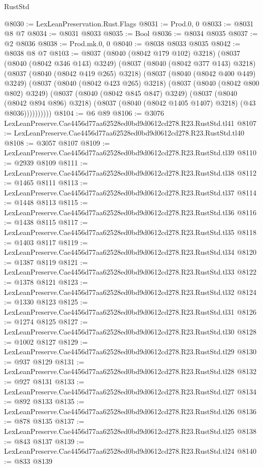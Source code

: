 \begin{lexlean}{RustStd}
\begin{coremodule}
@8030 := LexLeanPreservation.Rust.Flags
@8031 := Prod.{0, 0}
@8033 := @8031 @8 @7
@8034 := @8031 @8033
@8035 := Bool
@8036 := @8034 @8035
@8037 := @2 @8036
@8038 := Prod.mk.{0, 0}
@8040 := @8038 @8033 @8035
@8042 := @8038 @8 @7
@8103 := @8037
    (@8040 (@8042 @179 @102) @3218)
    (@8037
      (@8040 (@8042 @346 @143) @3249)
      (@8037
        (@8040 (@8042 @377 @143) @3218)
        (@8037
          (@8040 (@8042 @419 @265) @3218)
          (@8037
            (@8040 (@8042 @400 @449) @3249)
            (@8037
              (@8040 (@8042 @423 @265) @3218)
              (@8037
                (@8040 (@8042 @800 @802) @3249)
                (@8037
                  (@8040 (@8042 @845 @847) @3249)
                  (@8037
                    (@8040 (@8042 @894 @896) @3218)
                    (@8037 (@8040 (@8042 @1405 @1407) @3218) (@43 @8036))))))))))
@8104 := @6 @89
@8106 := @3076 LexLeanPreserve.Cae4456d77aa62528ed0bd9d0612cd278.R23.RustStd.tl41
@8107 := LexLeanPreserve.Cae4456d77aa62528ed0bd9d0612cd278.R23.RustStd.tl40
@8108 := @3057 @8107
@8109 := LexLeanPreserve.Cae4456d77aa62528ed0bd9d0612cd278.R23.RustStd.tl39
@8110 := @2939 @8109
@8111 := LexLeanPreserve.Cae4456d77aa62528ed0bd9d0612cd278.R23.RustStd.tl38
@8112 := @1465 @8111
@8113 := LexLeanPreserve.Cae4456d77aa62528ed0bd9d0612cd278.R23.RustStd.tl37
@8114 := @1448 @8113
@8115 := LexLeanPreserve.Cae4456d77aa62528ed0bd9d0612cd278.R23.RustStd.tl36
@8116 := @1438 @8115
@8117 := LexLeanPreserve.Cae4456d77aa62528ed0bd9d0612cd278.R23.RustStd.tl35
@8118 := @1403 @8117
@8119 := LexLeanPreserve.Cae4456d77aa62528ed0bd9d0612cd278.R23.RustStd.tl34
@8120 := @1387 @8119
@8121 := LexLeanPreserve.Cae4456d77aa62528ed0bd9d0612cd278.R23.RustStd.tl33
@8122 := @1378 @8121
@8123 := LexLeanPreserve.Cae4456d77aa62528ed0bd9d0612cd278.R23.RustStd.tl32
@8124 := @1330 @8123
@8125 := LexLeanPreserve.Cae4456d77aa62528ed0bd9d0612cd278.R23.RustStd.tl31
@8126 := @1274 @8125
@8127 := LexLeanPreserve.Cae4456d77aa62528ed0bd9d0612cd278.R23.RustStd.tl30
@8128 := @1002 @8127
@8129 := LexLeanPreserve.Cae4456d77aa62528ed0bd9d0612cd278.R23.RustStd.tl29
@8130 := @937 @8129
@8131 := LexLeanPreserve.Cae4456d77aa62528ed0bd9d0612cd278.R23.RustStd.tl28
@8132 := @927 @8131
@8133 := LexLeanPreserve.Cae4456d77aa62528ed0bd9d0612cd278.R23.RustStd.tl27
@8134 := @892 @8133
@8135 := LexLeanPreserve.Cae4456d77aa62528ed0bd9d0612cd278.R23.RustStd.tl26
@8136 := @878 @8135
@8137 := LexLeanPreserve.Cae4456d77aa62528ed0bd9d0612cd278.R23.RustStd.tl25
@8138 := @843 @8137
@8139 := LexLeanPreserve.Cae4456d77aa62528ed0bd9d0612cd278.R23.RustStd.tl24
@8140 := @833 @8139

\end{coremodule}
\end{lexlean}
